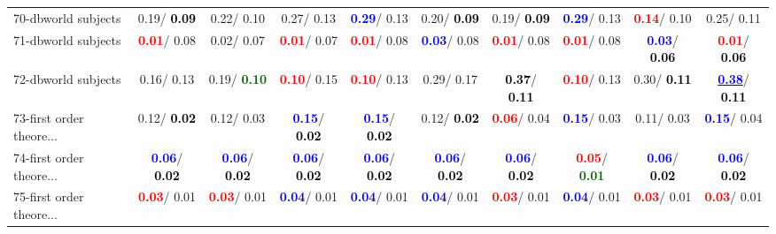 \begin{table}[h]
\begin{center}
{\begin{tabular}{lc|c|c|c|c|c|c|c|c}
70-dbworld subjects &   0.19/\textcolor{black}{\textbf{  0.09}} &   0.22/  0.10 &   0.27/  0.13 & \textcolor{blue}{\textbf{  0.29}}/  0.13 &   0.20/\textcolor{black}{\textbf{  0.09}} &   0.19/\textcolor{black}{\textbf{  0.09}} & \textcolor{blue}{\textbf{  0.29}}/  0.13 & \textcolor{red}{\textbf{  0.14}}/  0.10 &   0.25/  0.11 \\
71-dbworld subjects & \textcolor{red}{\textbf{  0.01}}/  0.08 &   0.02/  0.07 & \textcolor{red}{\textbf{  0.01}}/  0.07 & \textcolor{red}{\textbf{  0.01}}/  0.08 & \textcolor{blue}{\textbf{  0.03}}/  0.08 & \textcolor{red}{\textbf{  0.01}}/  0.08 & \textcolor{red}{\textbf{  0.01}}/  0.08 & \textcolor{blue}{\textbf{  0.03}}/\textcolor{black}{\textbf{  0.06}} & \textcolor{red}{\textbf{  0.01}}/\textcolor{black}{\textbf{  0.06}} \\ \hline
72-dbworld subjects &   0.16/  0.13 &   0.19/\textcolor{darkgreen}{\textbf{  0.10}} & \textcolor{red}{\textbf{  0.10}}/  0.15 & \textcolor{red}{\textbf{  0.10}}/  0.13 &   0.29/  0.17 & \textcolor{black}{\textbf{  0.37}}/\textcolor{black}{\textbf{  0.11}} & \textcolor{red}{\textbf{  0.10}}/  0.13 &   0.30/\textcolor{black}{\textbf{  0.11}} & \underline{\textcolor{blue}{\textbf{  0.38}}}/\textcolor{black}{\textbf{  0.11}} \\
73-first order theore... &   0.12/\textcolor{black}{\textbf{  0.02}} &   0.12/  0.03 & \textcolor{blue}{\textbf{  0.15}}/\textcolor{black}{\textbf{  0.02}} & \textcolor{blue}{\textbf{  0.15}}/\textcolor{black}{\textbf{  0.02}} &   0.12/\textcolor{black}{\textbf{  0.02}} & \textcolor{red}{\textbf{  0.06}}/  0.04 & \textcolor{blue}{\textbf{  0.15}}/  0.03 &   0.11/  0.03 & \textcolor{blue}{\textbf{  0.15}}/  0.04 \\
74-first order theore... & \textcolor{blue}{\textbf{  0.06}}/\textcolor{black}{\textbf{  0.02}} & \textcolor{blue}{\textbf{  0.06}}/\textcolor{black}{\textbf{  0.02}} & \textcolor{blue}{\textbf{  0.06}}/\textcolor{black}{\textbf{  0.02}} & \textcolor{blue}{\textbf{  0.06}}/\textcolor{black}{\textbf{  0.02}} & \textcolor{blue}{\textbf{  0.06}}/\textcolor{black}{\textbf{  0.02}} & \textcolor{blue}{\textbf{  0.06}}/\textcolor{black}{\textbf{  0.02}} & \textcolor{red}{\textbf{  0.05}}/\textcolor{darkgreen}{\textbf{  0.01}} & \textcolor{blue}{\textbf{  0.06}}/\textcolor{black}{\textbf{  0.02}} & \textcolor{blue}{\textbf{  0.06}}/\textcolor{black}{\textbf{  0.02}} \\
75-first order theore... & \textcolor{red}{\textbf{  0.03}}/  0.01 & \textcolor{red}{\textbf{  0.03}}/  0.01 & \textcolor{blue}{\textbf{  0.04}}/  0.01 & \textcolor{blue}{\textbf{  0.04}}/  0.01 & \textcolor{blue}{\textbf{  0.04}}/  0.01 & \textcolor{red}{\textbf{  0.03}}/  0.01 & \textcolor{blue}{\textbf{  0.04}}/  0.01 & \textcolor{red}{\textbf{  0.03}}/  0.01 & \textcolor{red}{\textbf{  0.03}}/  0.01 \\

\end{tabular}}
\end{center}
\end{table}

